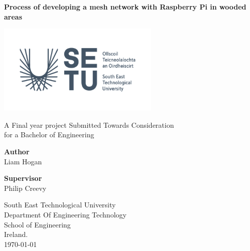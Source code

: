 \thispagestyle{empty}

\begin{center}
	\begin{LARGE}
		\textbf{Process of developing a mesh network with Raspberry Pi in wooded areas} \\
	
	\end{LARGE}

\vspace{40pt}

\begin{center}
	\includegraphics[width=220pt]{Images/SETU_Ireland_logo.png}
\end{center}

\vspace{50pt}

A Final year project Submitted Towards Consideration \\
for a Bachelor of Engineering \\

\vspace{60pt}

\textbf{Author} \\
Liam Hogan \\

\vspace{40pt}

\textbf{Supervisor} \\
Philip Creevy \\

\vspace{30pt}

South East Technological University \\
Department Of Engineering Technology \\
School of Engineering \\
Ireland. \\
\today
\end{center}
